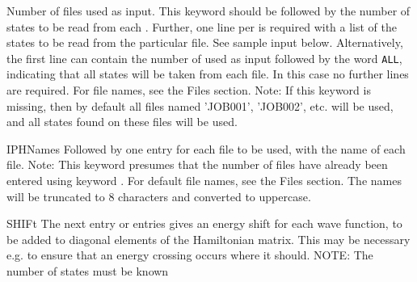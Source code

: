 \begin{keywordlist}
Number of
 files used as input. This keyword should be
followed by the number of
states to be read from each . Further, one line per
 is required with a list of the states to be
read from the particular file. See sample input below.
Alternatively, the first line can contain the number of  used
as input followed by the word \verb+ALL+, indicating that all states
will be taken from each file. In this case no further lines are required.
For  file names, see the Files section.
Note: If this keyword is missing, then by default all files named 'JOB001',
'JOB002', etc. will be used, and all states found on these files will be
used.
\item[IPHNames]
Followed by one entry for each  file to be used, with the
name of each file. Note: This keyword presumes that the number of
 files have already been entered using keyword .
For default  file names, see the Files section.
The names will be truncated to 8 characters and converted to uppercase.
\item[SHIFt]
The next entry or entries gives an energy shift for each wave function,
to be added to diagonal elements of the Hamiltonian matrix.
This may be necessary e.g. to ensure that an energy crossing occurs
where it should. NOTE: The number of states must be known

\end{keywordlist}
